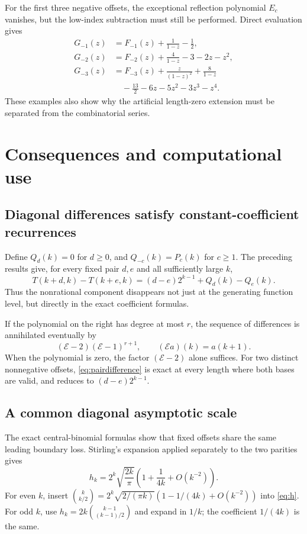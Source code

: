 \documentclass[11pt,letterpaper]{article}
\numberwithin{equation}{section}
\theoremstyle{definition}
\begin{document}
For the first three negative offsets, the exceptional reflection
polynomial $E_c$ vanishes, but the low-index subtraction must still be
performed.  Direct evaluation gives
\begin{align*}
G_{-1}(z)&=F_{-1}(z)+\frac1{1-z}-\frac12,\\
G_{-2}(z)&=F_{-2}(z)+\frac4{1-z}-3-2z-z^2,\\
G_{-3}(z)&=F_{-3}(z)+\frac{z}{(1-z)^2}+\frac8{1-z}\\
&\quad-\frac{13}{2}-6z-5z^2-3z^3-z^4.
\end{align*}
These examples also show why the artificial length-zero extension must
be separated from the combinatorial series.

\section{Consequences and computational use}
\label{sec:consequences}

\subsection{Diagonal differences satisfy constant-coefficient recurrences}
Define $Q_d(k)=0$ for $d\ge0$, and $Q_{-c}(k)=P_c(k)$ for $c\ge1$.
The preceding results give, for every fixed pair $d,e$ and all
sufficiently large $k$,
\begin{equation}\label{eq:pairdifference}
T(k+d,k)-T(k+e,k)
=(d-e)2^{k-1}+Q_d(k)-Q_e(k).
\end{equation}
Thus the nonrational component disappears not just at the generating
function level, but directly in the exact coefficient formulas.

If the polynomial on the right has degree at most $r$, the sequence of
differences is annihilated eventually by
\[
(\mathcal E-2)(\mathcal E-1)^{r+1},\qquad
(\mathcal E a)(k)=a(k+1).
\]
When the polynomial is zero, the factor $(\mathcal E-2)$ alone suffices.
For two distinct nonnegative offsets, \eqref{eq:pairdifference} is exact
at every length where both bases are valid, and reduces to
$(d-e)2^{k-1}$.

\subsection{A common diagonal asymptotic scale}
The exact central-binomial formulas show that fixed offsets share the
same leading boundary loss.  Stirling's expansion applied separately
to the two parities gives
\begin{equation}\label{eq:hasymp}
h_k=2^k\sqrt{\frac{2k}{\pi}}
\left(1+\frac1{4k}+O(k^{-2})\right).
\end{equation}
For even $k$, insert
$\binom{k}{k/2}=2^k\sqrt{2/(\pi k)}(1-1/(4k)+O(k^{-2}))$
into \eqref{eq:h}.  For odd $k$, use
$h_k=2k\binom{k-1}{(k-1)/2}$ and expand in $1/k$; the coefficient
$1/(4k)$ is the same.
\end{document}
